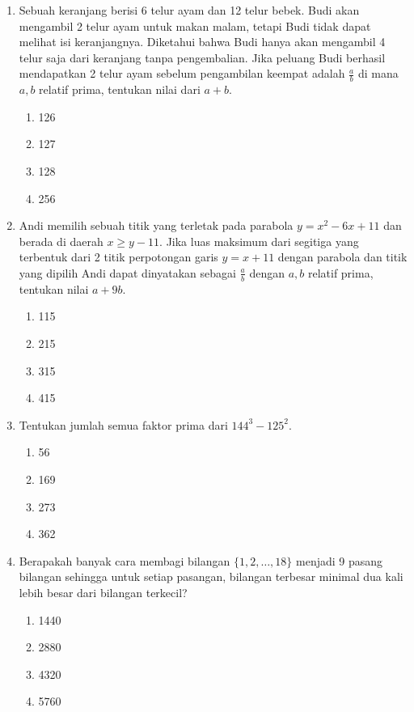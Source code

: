 \documentclass[12pt]{article}
\begin{document}
\begin{enumerate}
    \item Sebuah keranjang berisi 6 telur ayam dan 12 telur bebek. Budi akan mengambil 2 telur ayam untuk makan malam, tetapi Budi tidak dapat melihat isi keranjangnya. Diketahui bahwa Budi hanya akan mengambil 4 telur saja dari keranjang tanpa pengembalian. Jika peluang Budi berhasil mendapatkan 2 telur ayam sebelum pengambilan keempat adalah $\frac{a}{b}$ di mana $a, b$ relatif prima, tentukan nilai dari $a+b$.
    \begin{enumerate}
        \item 126
        \item 127
        \item 128
        \item 256
    \end{enumerate}

    \item Andi memilih sebuah titik yang terletak pada parabola $y=x^{2}-6x+11$ dan berada di daerah $x \ge y-11$. Jika luas maksimum dari segitiga yang terbentuk dari 2 titik perpotongan garis $y=x+11$ dengan parabola dan titik yang dipilih Andi dapat dinyatakan sebagai $\frac{a}{b}$ dengan $a, b$ relatif prima, tentukan nilai $a+9b$.
    \begin{enumerate}
        \item 115
        \item 215
        \item 315
        \item 415
    \end{enumerate}

    \item Tentukan jumlah semua faktor prima dari $144^{3}-125^{2}$.
    \begin{enumerate}
        \item 56
        \item 169
        \item 273
        \item 362
    \end{enumerate}

    \item Berapakah banyak cara membagi bilangan $\{1,2,\dots,18\}$ menjadi 9 pasang bilangan sehingga untuk setiap pasangan, bilangan terbesar minimal dua kali lebih besar dari bilangan terkecil?
    \begin{enumerate}
        \item 1440
        \item 2880
        \item 4320
        \item 5760
    \end{enumerate}


\end{enumerate}
\end{document}
